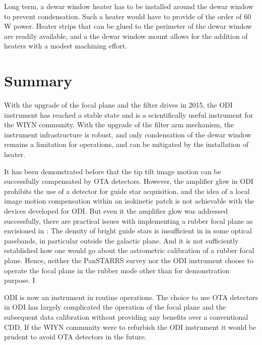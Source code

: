 \documentclass[]{spieman}
\begin{document}
Long term, a dewar window heater has to be installed  around the dewar window 
to prevent condensation. Such a heater would have to provide of the order of 60 
W power. Heater strips that can be glued to the perimeter of the dewar window 
are readily available, and a the dewar window mount allows for the addition of 
heaters with a modest machining effort.  


\section{Summary}

With the upgrade of the focal plane and the filter drives in 2015, the ODI
instrument has reached a stable state and is a scientifically useful instrument
for the WIYN community. With the upgrade of the filter arm mechanism, the
instrument infrastructure is robust, and only condensation of the dewar window
remains a limitation for operations, and can be mitigated by the installation of
heater.

It has been demonstrated before that the tip tilt image motion can be
successfully compensated by OTA detectors.  However, the amplifier glow in ODI
prohibits the use of a detector for guide star acquisition, and the idea of a
local image motion compensation within an isokinetic patch is not achievable
with the devices developed for ODI. But even it the amplifier glow was addressed
successfully, there are practical issues with implementing a rubber focal plane
as envisioned in \cite{tonry2002}: The density of  bright guide stars is
insufficient in in some  optical passbands, in particular outside the galactic
plane. And it is not sufficiently established how one would go about the
astrometric calibration of a rubber focal plane.  Hence, neither the PanSTARRS
survey nor the ODI instrument choose to operate the focal plane in the rubber
mode other than for demonstration purpose.  I

ODI is now an instrument in routine operations. The choice to use  OTA detectors
in ODI has largely complicated the operation of the focal plane and the
subsequent data calibration without providing any benefits over a conventional
CDD. If the WIYN community were to refurbish the ODI instrument it would be
prudent to avoid OTA detectors in the future.
 
 

\end{document}
